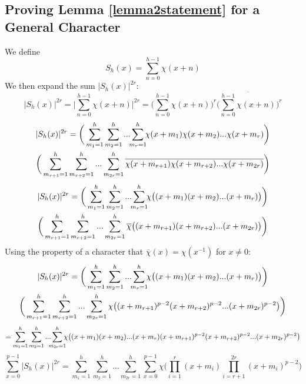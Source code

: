 \documentclass{report}
\begin{document}
\subsection{Proving Lemma \ref{lemma2statement} for a General Character}
We define
\begin{equation} \label{definesh}
S_h(x)=\sum\limits_{n=0}^{h-1}\chi(x+n)
\end{equation}
We then expand the sum $\lvert S_h(x)\rvert^{2r}$:
$$\lvert S_h(x)\rvert^{2r}= \Big\lvert\sum\limits_{n=0}^{h-1}\chi(x+n)\Big\rvert^{2r}= \Big(\sum\limits_{n=0}^{h-1}\chi(x+n)\Big)^r\Big(\overline{\sum\limits_{n=0}^{h-1}\chi(x+n)}\Big)^r$$
\begin{multline*}
\lvert S_h(x)\rvert^{2r} =\bigg(\sum\limits_{m_1=1}^h\sum\limits_{m_2=1}^h...\sum\limits_{\mathclap{m_{r}=1}}^h \chi(x+m_1)\chi(x+m_2)...\chi(x+m_{r})\bigg)
\\
\bigg(\sum\limits_{m_{r+1}=1}^h\sum\limits_{m_{r+2}=1}^h...\sum\limits_{m_{2r}=1}^h \overline{\chi(x+m_{r+1})\chi(x+m_{r+2})...\chi(x+m_{2r})}\bigg)
\end{multline*}
\begin{multline*}
\lvert S_h(x)\rvert^{2r} =\bigg(\sum\limits_{m_1=1}^h\sum\limits_{m_2=1}^h...\sum\limits_{\mathclap{m_{r}=1}}^h \chi\big((x+m_1)(x+m_2)...(x+m_{r})\big)\bigg)
\\
\bigg(\sum\limits_{m_{r+1}=1}^h\sum\limits_{m_{r+2}=1}^h...\sum\limits_{m_{2r}=1}^h \overline{\chi}\big((x+m_{r+1})(x+m_{r+2})...(x+m_{2r})\big)\bigg)
\end{multline*}
Using the property of a character that $\overline{\chi}(x)=\chi (x^{-1})$ for $x\neq0$:
\begin{multline*}
\lvert S_h(x)\rvert^{2r} =\bigg(\sum\limits_{m_1=1}^h\sum\limits_{m_2=1}^h...\sum\limits_{\mathclap{m_{r}=1}}^h \chi\big((x+m_1)(x+m_2)...(x+m_{r})\big)\bigg)
\\
\bigg(\sum\limits_{m_{r+1}=1}^h\sum\limits_{m_{r+2}=1}^h...\sum\limits_{m_{2r}=1}^h \chi\big((x+m_{r+1})^{p-2}(x+m_{r+2})^{p-2}...(x+m_{2r})^{p-2}\big)\bigg)
\end{multline*}
$$=\sum\limits_{m_1=1}^h\sum\limits_{m_2=1}^h...\sum\limits_{\mathclap{m_{2r}=1}}^h \chi\big((x+m_1)(x+m_2)...(x+m_{r})(x+m_{r+1})^{p-2}(x+m_{r+2})^{p-2}...(x+m_{2r})^{p-2}\big)$$
\begin{equation} \label{generaltuple}
\sum_{x=0}^{p-1}\lvert S_h(x)\rvert^{2r}= \sum\limits_{m_1=1}^h\sum\limits_{m_2=1}^h...\sum\limits_{m_{2r}=1}^h
\sum_{x=0}^{p-1}\chi\Big(\prod_{i=1}^r(x+m_i)\prod_{i=r+1}^{2r}(x+m_{i})^{p-2}\Big)
\end{equation}
\end{document}
